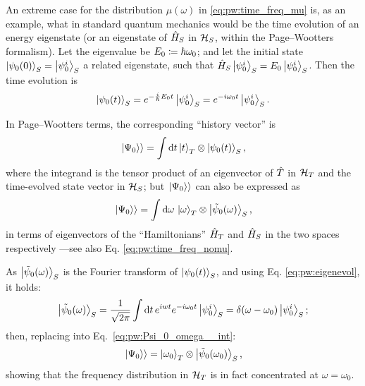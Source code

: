 An extreme case for the distribution %
$\mu(\omega)$ in \eqref{eq:pw:time_freq_mu} %
is, as an example, what in standard quantum mechanics would be the time evolution of an energy eigenstate
(or an eigenstate of $\hat{H}_S$ in $\mathcal{H}_S$, within the Page--Wootters formalism).
Let the eigenvalue be $E_0 \coloneqq \hbar\omega_{0}$;
and let the initial state $\ket{\psi_{0}(0)}_S = \ket{\psi_0^i}_S$ a related eigenstate,
such that $\hat{H}_{S}\ket{\psi_0^i}_S = E_{0}\ket{\psi_0^i}_S$.
Then the time evolution is
\begin{equation}\label{eq:pw:eigenevol}
  \ket{\psi_{0}(t)}_S = e^{-\frac{i}{\hbar}E_{0}t}\ket{\psi_0^i}_S = e^{-i \omega_{0} t}\ket{\psi_0^i}_S \text{.}
\end{equation}

In Page--Wootters terms, the corresponding ``history vector'' is
\begin{equation}\label{eq:pw:Psi_0_t}
  \left.\left| \Psi_0 \right\rangle\right\rangle = \int \dd{t} \ket{t}_T \otimes \ket{\psi_0(t)}_S \text{,}
\end{equation}
where the integrand is the tensor product of an eigenvector of $\hat{T}$ in $\mathcal{H}_T$
and the time-evolved state vector in $\mathcal{H}_S$;
but $\left.\left| \Psi_0 \right\rangle\right\rangle$ can also be expressed as
\begin{equation}\label{eq:pw:Psi_0_omega__int}
  \left.\left| \Psi_0 \right\rangle\right\rangle = \int \dd{\omega} \, \ket{\omega}_{T}\otimes\ket{\tilde{\psi}_{0}(\omega)}_{S} \text{,}
\end{equation}
in terms of eigenvectors of the ``Hamiltonians''
$\hat{H}_T$ and $\hat{H}_S$ in the two spaces respectively %
---see also Eq. \eqref{eq:pw:time_freq_nomu}.

As $\ket{\tilde{\psi}_{0}(\omega)}_{S}$ is the Fourier transform of $\ket{\psi_0(t)}_S$, and using Eq. \eqref{eq:pw:eigenevol}, it holds:
\[
  \ket{\tilde{\psi}_0(\omega)}_S = \frac{1}{\sqrt{2\pi}} \int \dd{t} e^{iwt} e^{-i\omega_{0}t} \ket{\psi_0^i}_S
  = \delta(\omega-\omega_0)\ket{\psi_0^i}_S \text{;}
\]
then, replacing into Eq.~\eqref{eq:pw:Psi_0_omega__int}:
\begin{equation}\label{eq:pw:Psi_0_omega}
  \left.\left| \Psi_0 \right\rangle\right\rangle = \ket{\omega_0}_{T}\otimes\ket{\tilde{\psi}_{0}(\omega_0)}_{S} \text{,}
\end{equation}
%
showing that the frequency distribution in $\mathcal{H}_T$ is in fact concentrated at $\omega = \omega_0$. 


